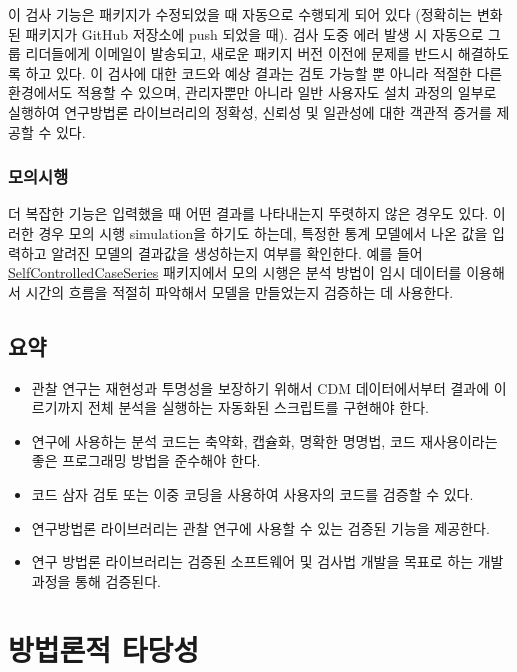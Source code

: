 \documentclass[10.5pt]{book}
\theoremstyle{definition}
\theoremstyle{definition}
\theoremstyle{definition}
\theoremstyle{remark}
\let\BeginKnitrBlock\begin \let\EndKnitrBlock\end
\begin{document}
이 검사 기능은 패키지가 수정되었을 때 자동으로 수행되게 되어 있다
(정확히는 변화된 패키지가 GitHub 저장소에 push 되었을 때). 검사 도중
에러 발생 시 자동으로 그룹 리더들에게 이메일이 발송되고, 새로운 패키지
버전 이전에 문제를 반드시 해결하도록 하고 있다. 이 검사에 대한 코드와
예상 결과는 검토 가능할 뿐 아니라 적절한 다른 환경에서도 적용할 수
있으며, 관리자뿐만 아니라 일반 사용자도 설치 과정의 일부로 실행하여
연구방법론 라이브러리의 정확성, 신뢰성 및 일관성에 대한 객관적 증거를
제공할 수 있다.

\subsection{모의시행}

더 복잡한 기능은 입력했을 때 어떤 결과를 나타내는지 뚜렷하지 않은 경우도
있다. 이러한 경우 모의 시행 simulation을 하기도 하는데, 특정한 통계
모델에서 나온 값을 입력하고 알려진 모델의 결과값을 생성하는지 여부를
확인한다. 예를 들어
\href{https://ohdsi.github.io/SelfControlledCaseSeries/}{SelfControlledCaseSeries}
패키지에서 모의 시행은 분석 방법이 임시 데이터를 이용해서 시간의 흐름을
적절히 파악해서 모델을 만들었는지 검증하는 데 사용한다.

\section{요약}\label{-15}

\BeginKnitrBlock{rmdsummary}
\begin{itemize}
\item
  관찰 연구는 재현성과 투명성을 보장하기 위해서 CDM 데이터에서부터
  결과에 이르기까지 전체 분석을 실행하는 자동화된 스크립트를 구현해야
  한다.
\item
  연구에 사용하는 분석 코드는 축약화, 캡슐화, 명확한 명명법, 코드
  재사용이라는 좋은 프로그래밍 방법을 준수해야 한다.
\item
  코드 삼자 검토 또는 이중 코딩을 사용하여 사용자의 코드를 검증할 수
  있다.
\item
  연구방법론 라이브러리는 관찰 연구에 사용할 수 있는 검증된 기능을
  제공한다.
\item
  연구 방법론 라이브러리는 검증된 소프트웨어 및 검사법 개발을 목표로
  하는 개발 과정을 통해 검증된다.
\end{itemize}
\EndKnitrBlock{rmdsummary}

\chapter{방법론적 타당성}\label{MethodValidity}
\end{document}
